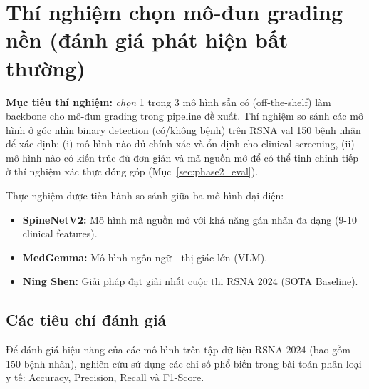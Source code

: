 
\section[Thí nghiệm chọn mô-đun grading nền]{Thí nghiệm chọn mô-đun grading nền (đánh giá phát hiện bất thường)}
\label{sec:eval_detection}

\textbf{Mục tiêu thí nghiệm:} \emph{chọn} 1 trong 3 mô hình sẵn có (off-the-shelf) làm backbone cho mô-đun grading trong pipeline đề xuất. Thí nghiệm so sánh các mô hình ở góc nhìn binary detection (có/không bệnh) trên RSNA val 150 bệnh nhân để xác định: (i) mô hình nào đủ chính xác và ổn định cho clinical screening, (ii) mô hình nào có kiến trúc đủ đơn giản và mã nguồn mở để có thể tinh chỉnh tiếp ở thí nghiệm xác thực đóng góp (Mục~\ref{sec:phase2_eval}).

Thực nghiệm được tiến hành so sánh giữa ba mô hình đại diện:
\begin{itemize}
    \item \textbf{SpineNetV2:} Mô hình mã nguồn mở với khả năng gán nhãn đa dạng (9-10 clinical features).
    \item \textbf{MedGemma:} Mô hình ngôn ngữ - thị giác lớn (VLM).
    \item \textbf{Ning Shen:} Giải pháp đạt giải nhất cuộc thi RSNA 2024 (SOTA Baseline).
\end{itemize}
\subsection{Các tiêu chí đánh giá}
Để đánh giá hiệu năng của các mô hình trên tập dữ liệu RSNA 2024 (bao gồm 150 bệnh nhân), nghiên cứu sử dụng các chỉ số phổ biến trong bài toán phân loại y tế: Accuracy, Precision, Recall và F1-Score.

